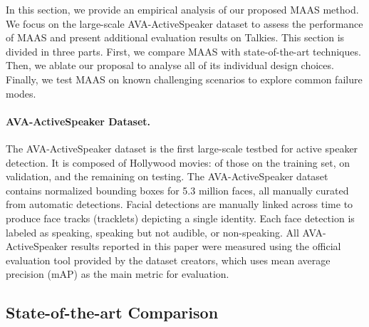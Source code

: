 \documentclass[10pt,twocolumn,letterpaper]{article}
\begin{document}
In this section, we provide an empirical analysis of our proposed MAAS method. We focus on the large-scale AVA-ActiveSpeaker dataset \cite{roth2019ava} to assess the performance of MAAS and present additional evaluation results on Talkies. This section is divided in three parts. First, we compare MAAS with state-of-the-art techniques. Then, we ablate our proposal to analyse all of its individual design choices. Finally, we test MAAS on known challenging scenarios to explore common failure modes.

\paragraph{AVA-ActiveSpeaker Dataset.} The AVA-ActiveSpeaker dataset \cite{roth2019ava} is the first large-scale testbed for active speaker detection. It is composed of  Hollywood movies:  of those on the training set,  on validation, and the remaining  on testing. The AVA-ActiveSpeaker dataset contains normalized bounding boxes for 5.3 million faces, all manually curated from automatic detections. Facial detections are manually linked across time to produce face tracks (tracklets) depicting a single identity. Each face detection is labeled as speaking, speaking but not audible, or non-speaking. All AVA-ActiveSpeaker results reported in this paper were measured using  the official evaluation tool provided by the dataset creators, which uses mean average precision (mAP) as the main metric for evaluation.


\subsection{State-of-the-art Comparison}
\label{subsec:sota}
\end{document}
